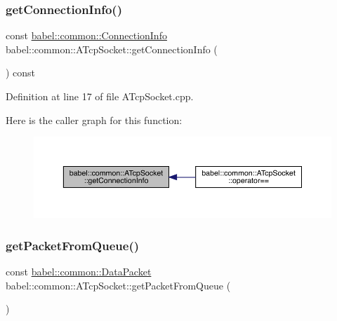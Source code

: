\mbox{\label{classbabel_1_1common_1_1_a_tcp_socket_a5e834bf865edebb37d8018a56668f3bf}} 
\subsubsection{\texorpdfstring{get\+Connection\+Info()}{getConnectionInfo()}}
{\footnotesize\ttfamily const \mbox{\hyperlink{classbabel_1_1common_1_1_connection_info}{babel\+::common\+::\+Connection\+Info}} babel\+::common\+::\+A\+Tcp\+Socket\+::get\+Connection\+Info (\begin{DoxyParamCaption}{ }\end{DoxyParamCaption}) const}



Definition at line 17 of file A\+Tcp\+Socket.\+cpp.

Here is the caller graph for this function\+:\nopagebreak
\begin{figure}[H]
\begin{center}
\leavevmode
\includegraphics[width=350pt]{classbabel_1_1common_1_1_a_tcp_socket_a5e834bf865edebb37d8018a56668f3bf_icgraph}
\end{center}
\end{figure}
\mbox{\label{classbabel_1_1common_1_1_a_tcp_socket_a2e057c8d9e01aba599e4314a93a5d238}} 
\subsubsection{\texorpdfstring{get\+Packet\+From\+Queue()}{getPacketFromQueue()}}
{\footnotesize\ttfamily const \mbox{\hyperlink{classbabel_1_1common_1_1_data_packet}{babel\+::common\+::\+Data\+Packet}} babel\+::common\+::\+A\+Tcp\+Socket\+::get\+Packet\+From\+Queue (\begin{DoxyParamCaption}{ }\end{DoxyParamCaption})\hspace{0.3cm}{\ttfamily [protected]}}



